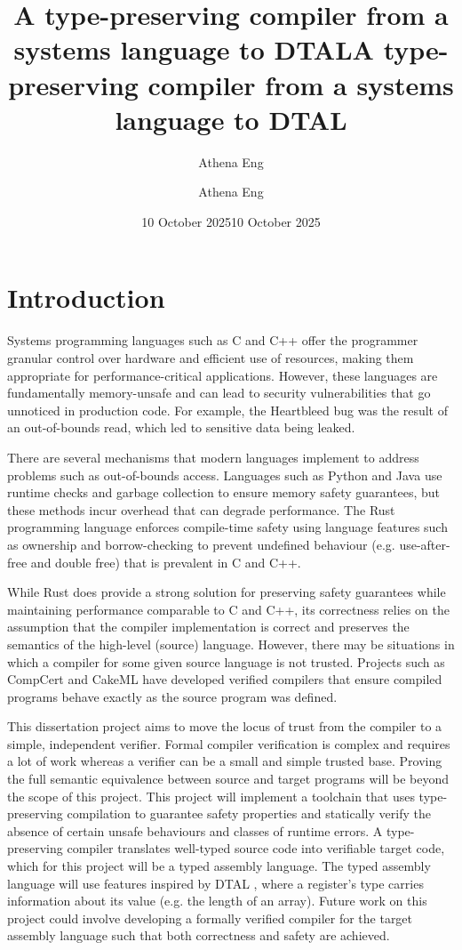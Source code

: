 \documentclass[a4paper, 12pt]{article}
\title{A type-preserving compiler from a systems language to DTAL}
\author{Athena Eng}
\date{10 October 2025}
\begin{document}
\title{A type-preserving compiler from a systems language to DTAL}
\author{Athena Eng}
\date{10 October 2025}

\maketitle

\section{Introduction}

Systems programming languages such as C and C++ offer the programmer granular control over hardware and efficient use of resources, making them appropriate for performance-critical applications. However, these languages are fundamentally memory-unsafe and can lead to security vulnerabilities that go unnoticed in production code. For example, the Heartbleed bug \cite{CVE-2014-0160} was the result of an out-of-bounds read, which led to sensitive data being leaked.

There are several mechanisms that modern languages implement to address problems such as out-of-bounds access. Languages such as Python and Java use runtime checks and garbage collection to ensure memory safety guarantees, but these methods incur overhead that can degrade performance. The Rust programming language enforces compile-time safety using language features such as ownership and borrow-checking to prevent undefined behaviour (e.g. use-after-free and double free) that is prevalent in C and C++.

While Rust does provide a strong solution for preserving safety guarantees while maintaining performance comparable to C and C++, its correctness relies on the assumption that the compiler implementation is correct and preserves the semantics of the high-level (source) language. However, there may be situations in which a compiler for some given source language is not trusted. Projects such as CompCert \cite{compcert} and CakeML \cite{cakeml} have developed verified compilers that ensure compiled programs behave exactly as the source program was defined.

This dissertation project aims to move the locus of trust from the compiler to a simple, independent verifier. Formal compiler verification is complex and requires a lot of work whereas a verifier can be a small and simple trusted base. Proving the full semantic equivalence between source and target programs will be beyond the scope of this project. This project will implement a toolchain that uses type-preserving compilation to guarantee safety properties and statically verify the absence of certain unsafe behaviours and classes of runtime errors. A type-preserving compiler translates well-typed source code into verifiable target code, which for this project will be a typed assembly language. The typed assembly language will use features inspired by DTAL \cite{dtal}, where a register's type carries information about its value (e.g. the length of an array). Future work on this project could involve developing a formally verified compiler for the target assembly language such that both correctness and safety are achieved.
\end{document}
